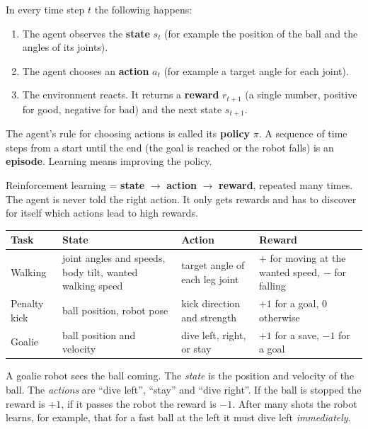 In every time step $t$ the following happens:
\begin{enumerate}[nosep]
  \item The agent observes the \textbf{state} $s_t$ (for example the position of the ball and the angles of its joints).
  \item The agent chooses an \textbf{action} $a_t$ (for example a target angle for each joint).
  \item The environment reacts. It returns a \textbf{reward} $r_{t+1}$ (a single number, positive for good, negative for bad) and the next state $s_{t+1}$.
\end{enumerate}
The agent's rule for choosing actions is called its \textbf{policy} $\pi$. A sequence of time steps from a start until the end (the goal is reached or the robot falls) is an \textbf{episode}. Learning means improving the policy.

\begin{keyidea}
Reinforcement learning = \textbf{state} $\to$ \textbf{action} $\to$ \textbf{reward}, repeated many times. The agent is never told the right action. It only gets rewards and has to discover for itself which actions lead to high rewards.
\end{keyidea}

\begin{center}
\renewcommand{\arraystretch}{1.3}
\begin{tabular}{p{2.6cm}p{3.6cm}p{3.4cm}p{3.5cm}}
\textbf{Task} & \textbf{State} & \textbf{Action} & \textbf{Reward}\\ \hline
Walking & joint angles and speeds, body tilt, wanted walking speed & target angle of each leg joint & $+$ for moving at the wanted speed, $-$ for falling\\
Penalty kick & ball position, robot pose & kick direction and strength & $+1$ for a goal, $0$ otherwise\\
Goalie & ball position and velocity & dive left, right, or stay & $+1$ for a save, $-1$ for a goal\\
\end{tabular}
\end{center}

\begin{example}
A goalie robot sees the ball coming. The \emph{state} is the position and velocity of the ball. The \emph{actions} are ``dive left'', ``stay'' and ``dive right''. If the ball is stopped the reward is $+1$, if it passes the robot the reward is $-1$. After many shots the robot learns, for example, that for a fast ball at the left it must dive left \emph{immediately}.
\end{example}

